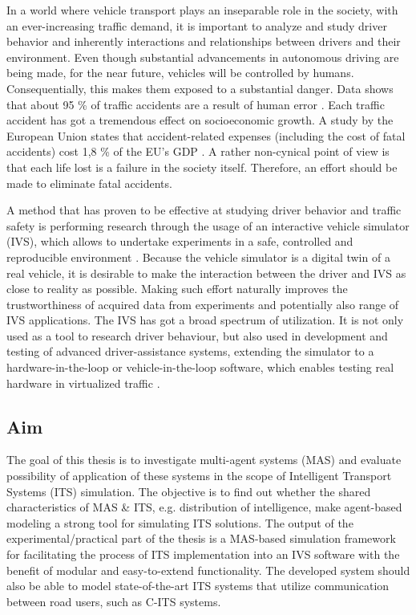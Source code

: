 \documentclass[titlepage, 12pt]{article}
\begin{document}
In a world where vehicle transport plays an inseparable role in the society, with an ever-increasing
traffic demand, it is important to analyze and study driver behavior and inherently interactions and
relationships between drivers and their environment. Even though
substantial advancements in autonomous driving are being made, for the near future, vehicles 
will be controlled by humans. Consequentially, this makes them exposed to a substantial danger. 
Data shows that about 95 \% of traffic accidents are a result of human error \cite{Parliament2021}. 
Each traffic accident has got a tremendous effect on socioeconomic growth. A study by the European
Union states that accident-related expenses (including the cost of fatal accidents) cost 1,8 \% of the EU's GDP \cite{Wijnen2017}.  
A rather non-cynical point of view is that each life lost is a failure in the society itself.
Therefore, an effort should be made to eliminate fatal accidents.

A method that has proven to be effective at studying driver behavior and traffic safety is 
performing research through the usage of an interactive vehicle simulator (IVS), which allows to undertake experiments in a safe,
controlled and reproducible environment \cite{Winter2012}. Because the vehicle simulator is a digital
twin of a real vehicle, it is desirable to make the interaction between the driver
and IVS as close to reality as possible. Making such effort naturally improves the trustworthiness of
acquired data from experiments and potentially also range of IVS applications. The IVS has
got a broad spectrum of utilization. It is not only used as a tool to research driver
behaviour, but also used in development and testing of advanced driver-assistance systems,
extending the simulator to a hardware-in-the-loop or vehicle-in-the-loop software, which
enables testing real hardware in virtualized traffic \cite{Horvath2019}.

\subsection{Aim}

The goal of this thesis is to investigate multi-agent systems (MAS) and evaluate possibility of
application of these systems in the scope of Intelligent Transport Systems (ITS) simulation.
The objective is to find out whether the shared characteristics of MAS \& ITS, e.g.
distribution of intelligence, make agent-based modeling a strong tool for simulating ITS
solutions. The output of the experimental/practical part of the thesis is a MAS-based
simulation framework for facilitating the process of ITS implementation into an IVS software with the benefit
of modular and easy-to-extend functionality. The developed system should also be able to model
state-of-the-art ITS systems that utilize communication between road users, such as C-ITS
systems. 
\end{document}
